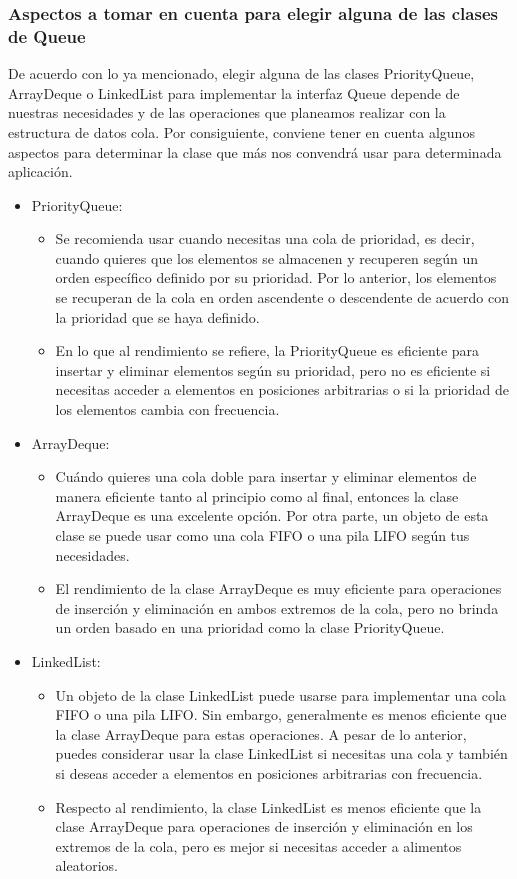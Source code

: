 \documentclass{report}
\begin{document}
\subsubsection{Aspectos a tomar en cuenta para elegir alguna de las clases de Queue}
De acuerdo con lo ya mencionado, elegir alguna de las clases PriorityQueue, ArrayDeque o LinkedList para implementar la interfaz Queue depende de nuestras necesidades y de las operaciones que planeamos realizar con la estructura de datos cola. Por consiguiente, conviene tener en cuenta algunos aspectos para determinar la clase que más nos convendrá usar para determinada aplicación.
\begin{itemize}
    \item PriorityQueue:
    \begin{itemize}
    \item Se recomienda usar cuando necesitas una cola de prioridad, es decir, cuando quieres que los elementos se almacenen y recuperen según un orden específico definido por su prioridad. Por lo anterior, los elementos se recuperan de la cola en orden ascendente o descendente de acuerdo con la prioridad que se haya definido.
    \item En lo que al rendimiento se refiere, la PriorityQueue es eficiente para insertar y eliminar elementos según su prioridad, pero no es eficiente si necesitas acceder a elementos en posiciones arbitrarias o si la prioridad de los elementos cambia con frecuencia.
    \end{itemize}
    \item ArrayDeque:
    \begin{itemize}
    \item Cuándo quieres una cola doble para insertar y eliminar elementos de manera eficiente tanto al principio como al final, entonces la clase ArrayDeque es una excelente opción. Por otra parte, un objeto de esta clase se puede usar como una cola FIFO o una pila LIFO según tus necesidades.
    \item El rendimiento de la clase ArrayDeque es muy eficiente para operaciones de inserción y eliminación en ambos extremos de la cola, pero no brinda un orden basado en una prioridad como la clase PriorityQueue.
    \end{itemize}
    \item LinkedList:
    \begin{itemize}
    \item Un objeto de la clase LinkedList puede usarse para implementar una cola FIFO o una pila LIFO. Sin embargo, generalmente es menos eficiente que la clase ArrayDeque para estas operaciones. A pesar de lo anterior, puedes considerar usar la clase LinkedList si necesitas una cola y también si deseas acceder a elementos en posiciones arbitrarias con frecuencia.
    \item Respecto al rendimiento, la clase LinkedList es menos eficiente que la clase ArrayDeque para operaciones de inserción y eliminación en los extremos de la cola, pero es mejor si necesitas acceder a alimentos aleatorios.
    \end{itemize}
\end{itemize}
\end{document}
